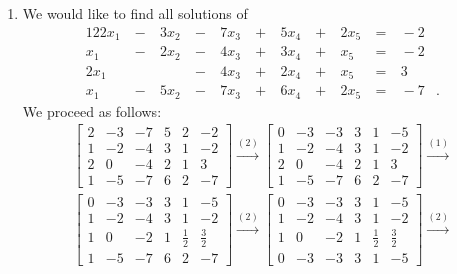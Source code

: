 \documentclass[12pt]{article}
\begin{document}
\begin{enumerate}
  \item
    We would like to find all solutions of
    \begin{alignat*}{12}
      2x_1\ &-&\ 3x_2\ &-&\ 7x_3\ &+&\ 5x_4\ &+&\ 2x_5\
        &=&\ -2&\\
      x_1\  &-&\ 2x_2\ &-&\ 4x_3\ &+&\ 3x_4\ &+&\ x_5\
        &=&\ -2&\\
      2x_1\ & &\     \ &-&\ 4x_3\ &+&\ 2x_4\ &+&\ x_5\
        &=&\ 3&\\
      x_1\  &-&\ 5x_2\ &-&\ 7x_3\ &+&\ 6x_4\ &+&\ 2x_5\
        &=&\ -7&.
    \end{alignat*}
    We proceed as follows:
    \begin{align*}
      \begin{bmatrix}
        2 & -3 & -7 & 5 & 2 & -2\\
        1 & -2 & -4 & 3 & 1 & -2\\
        2 & 0  & -4 & 2 & 1 & 3\\
        1 & -5 & -7 & 6 & 2 & -7
      \end{bmatrix}
      \xrightarrow{(2)}
      \begin{bmatrix}
        0 & -3 & -3 & 3 & 1 & -5\\
        1 & -2 & -4 & 3 & 1 & -2\\
        2 & 0  & -4 & 2 & 1 & 3\\
        1 & -5 & -7 & 6 & 2 & -7
      \end{bmatrix}
      \xrightarrow{(1)}
    \end{align*}
    \begin{align*}
      \begin{bmatrix}
        0 & -3 & -3 & 3 & 1           & -5\\
        1 & -2 & -4 & 3 & 1           & -2\\
        1 & 0  & -2 & 1 & \frac{1}{2} & \frac{3}{2}\\
        1 & -5 & -7 & 6 & 2           & -7
      \end{bmatrix}
      \xrightarrow{(2)}
      \begin{bmatrix}
        0 & -3 & -3 & 3 & 1           & -5\\
        1 & -2 & -4 & 3 & 1           & -2\\
        1 & 0  & -2 & 1 & \frac{1}{2} & \frac{3}{2}\\
        0 & -3 & -3 & 3 & 1           & -5
      \end{bmatrix}
      \xrightarrow{(2)}
    \end{align*}

\end{enumerate}
\end{document}
